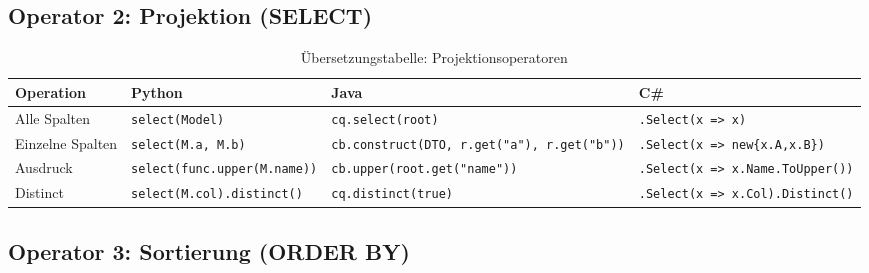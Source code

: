 \subsection{Operator 2: Projektion (SELECT)}
\label{subsec:op_project}

\begin{table}
\centering
\caption{Übersetzungstabelle: Projektionsoperatoren}
\label{tab:project_ops}
\renewcommand{\arraystretch}{1.4}
\begin{tabularx}{\textwidth}{lXXX}
\toprule
\textbf{Operation} & \textbf{Python} & \textbf{Java} & \textbf{C\#} \\
\midrule
Alle Spalten
  & \texttt{select(Model)}
  & \texttt{cq.select(root)}
  & \texttt{.Select(x => x)} \\
Einzelne Spalten
  & \texttt{select(M.a, M.b)}
  & \texttt{cb.construct(DTO, r.get("a"), r.get("b"))}
  & \texttt{.Select(x => new\{x.A,x.B\})} \\
Ausdruck
  & \texttt{select(func.upper(M.name))}
  & \texttt{cb.upper(root.get("name"))}
  & \texttt{.Select(x => x.Name.ToUpper())} \\
Distinct
  & \texttt{select(M.col).distinct()}
  & \texttt{cq.distinct(true)}
  & \texttt{.Select(x => x.Col).Distinct()} \\
\bottomrule
\end{tabularx}
\end{table}

\subsection{Operator 3: Sortierung (ORDER BY)}
\label{subsec:op_sort}

